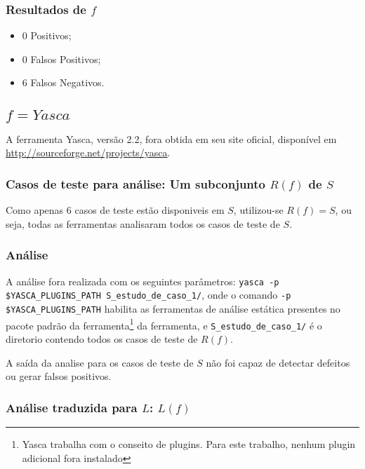 \subsubsection{Resultados de $f$}

\begin{itemize}
  \item 0 Positivos;
  \item 0 Falsos Positivos;
  \item 6 Falsos Negativos.
\end{itemize}

\subsection{$f = Yasca$}

A ferramenta Yasca, versão 2.2, fora obtida em seu site oficial, disponível em \url{http://sourceforge.net/projects/yasca}.

\subsubsection{Casos de teste para análise: Um subconjunto $R(f)$ de $S$}

Como apenas 6 casos de teste estão disponiveis em $S$, utilizou-se $R(f) = S$, ou seja, todas as ferramentas analisaram todos os casos de teste de $S$.

\subsubsection{Análise}

A análise fora realizada com os seguintes parâmetros:
\lstinline[mathescape=false]{yasca -p $YASCA_PLUGINS_PATH S_estudo_de_caso_1/},
onde o comando \lstinline[mathescape=false]{-p $YASCA_PLUGINS_PATH} habilita as ferramentas de análise estática presentes no pacote padrão da ferramenta\footnote{Yasca trabalha com o conseito de plugins. Para este trabalho, nenhum plugin adicional fora instalado} da ferramenta, e \lstinline{S_estudo_de_caso_1/} é o diretorio contendo todos os casos de teste de $R(f)$.

A saída da analise para os casos de teste de $S$ não foi capaz de detectar defeitos ou gerar falsos positivos.

\subsubsection{Análise traduzida para $L$: $L(f)$}

